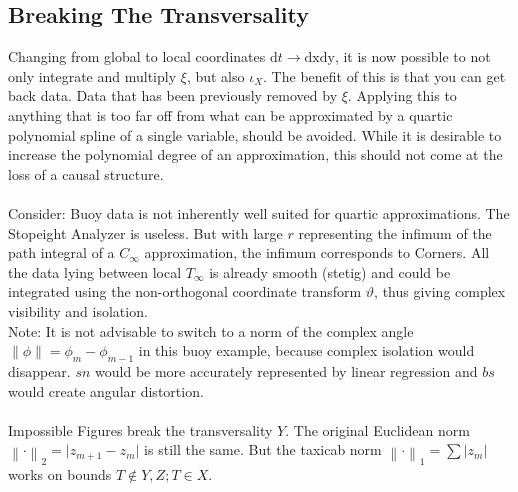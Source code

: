 \documentclass{report}
\newcommand\norm[1]{\left\lVert#1\right\rVert}
\begin{document}
\subsection{Breaking The Transversality}
Changing from global to local coordinates $\mathrm{d}t\rightarrow\mathrm{dx}\mathrm{dy}$, it is now possible to not only integrate and multiply $\xi$, but also $\iota_{X}$. The benefit of this is that you can get back data. Data that has been previously removed by $\xi$. Applying this to anything that is too far off from what can be approximated by a quartic polynomial spline of a single variable, should be avoided. While it is desirable to increase the polynomial degree of an approximation, this should not come at the loss of a causal structure.\\\\
Consider: Buoy data is not inherently well suited for quartic approximations. The Stopeight Analyzer is useless. But with large $r$ representing the infimum of the path integral of a $C_{\infty}$ approximation, the infimum corresponds to Corners. All the data lying between local $T_{\infty}$ is already smooth (stetig) and could be integrated using the non-orthogonal coordinate transform $\vartheta$, thus giving complex visibility and isolation.\\
Note: It is not advisable to switch to a norm of the complex angle $\norm{\phi} = \phi_{m}-\phi_{m-1}$ in this buoy example, because complex isolation would disappear. $sn$ would be more accurately represented by linear regression and $bs$ would create angular distortion.\\\\
Impossible Figures break the transversality $Y$. The original Euclidean norm $\norm{\cdot}_2 = \lvert z_{m+1}-z_{m} \rvert$ is still the same. But the taxicab norm $\norm{\cdot}_1 = \sum \lvert z_{m} \rvert$ works on bounds $T \not \in Y,Z; T \in X$.
\end{document}
